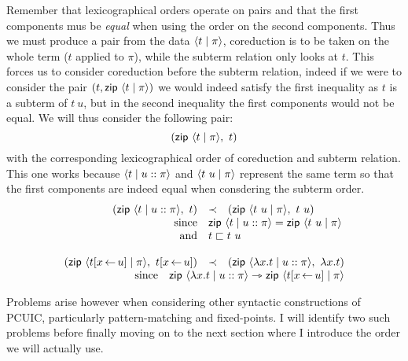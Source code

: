 Remember that lexicographical orders operate on pairs and that the first
components mus be \emph{equal} when using the order on the second components.
Thus we must produce a pair from the data \(\langle t \mid \pi \rangle\), coreduction is
to be taken on the whole term (\(t\) applied to \(\pi\)), while the subterm
relation only looks at \(t\).
This forces us to consider coreduction before the subterm relation, indeed if we
were to consider the pair \((t, \mathsf{zip}\ \langle t \mid \pi \rangle)\) we would indeed
satisfy the first inequality as \(t\) is a subterm of \(t\ u\), but in the
second inequality the first components would not be equal.
We will thus consider the following pair:
\[
  (\mathsf{zip}\ \langle t \mid \pi \rangle,\ t)
\]
with the corresponding lexicographical order of coreduction and subterm
relation. This one works because \(\langle t \mid u :: \pi \rangle\) and
\(\langle t\ u \mid \pi \rangle\) represent the same term so that the first components
are indeed equal when consdering the subterm order.
\[
  \begin{array}{rcl}
    (\zip\ \dpair{t \mid u :: \pi},\ t) &\prec&
    (\zip\ \dpair{t\ u \mid \pi},\ t\ u) \\
    \text{since} &
    \multicolumn{2}{l}{
      \zip\ \dpair{t \mid u :: \pi} = \zip\ \dpair{t\ u \mid \pi}
    } \\
    \text{and} &
    \multicolumn{2}{l}{t \sqsubset t\ u} \\
    \\
    (\zip\ \dpair{t[x \sto u] \mid \pi},\ t[x \sto u]) &\prec&
    (\zip\ \dpair{\lambda x.t \mid u :: \pi},\ \lambda x.t) \\
    \multicolumn{3}{r}{
      \text{since} \quad
      \zip\ \dpair{\lambda x.t \mid u :: \pi} \red
      \zip\ \dpair{t[x \sto u] \mid \pi}
    }
  \end{array}
\]

Problems arise however when considering other syntactic constructions of
\acrshort{PCUIC}, particularly pattern-matching and fixed-points.
I will identify two such problems before finally moving on to the next section
where I introduce the order we will actually use.


